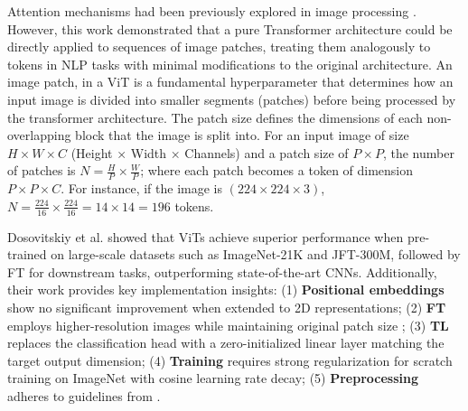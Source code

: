 \documentclass[runningheads]{llncs}
\begin{document}
Attention mechanisms had been previously explored in image processing
\cite{dosovitskiy2020image}. However, this work demonstrated that a
pure Transformer architecture could be directly applied to sequences
of image patches, treating them analogously to tokens in \ac{NLP}
tasks with minimal modifications to the original architecture. An
image patch, in a \ac{ViT} is a fundamental hyperparameter that
determines how an input image is divided into smaller segments
(patches) before being processed by the transformer architecture. The
patch size defines the dimensions of each non-overlapping block that
the image is split into. For an input image of size
\(H \times W \times C\) (Height × Width × Channels) and a patch size
of \(P \times P\), the number of patches is \(N = \frac{H}{P} \times
\frac{W}{P}\); where each patch becomes a token of dimension \(P
\times P \times C\). For instance, if the image is $(224 \times 224
\times 3)$, $N=\frac{224}{16}\times \frac{224}{16} = 14\times 14 =
196$ tokens.

Dosovitskiy et al. showed that \ac{ViTs} achieve
superior performance when pre-trained on large-scale datasets such as
ImageNet-21K and JFT-300M, followed by \ac{FT} for downstream
tasks, outperforming state-of-the-art \ac{CNNs}. Additionally, their
work provides key implementation insights: (1) \textbf{Positional
  embeddings} show no significant improvement when extended to 2D
representations; (2) \textbf{\ac{FT}} employs higher-resolution
images while maintaining original patch size \cite{Kolesnikov2019};
(3) \textbf{\ac{TL}} replaces the classification head with a
zero-initialized linear layer matching the target output dimension;
(4) \textbf{Training} requires strong regularization for scratch
training on ImageNet with cosine learning rate decay; (5)
\textbf{Preprocessing} adheres to guidelines from
\cite{Kolesnikov2019}. 

\end{document}
